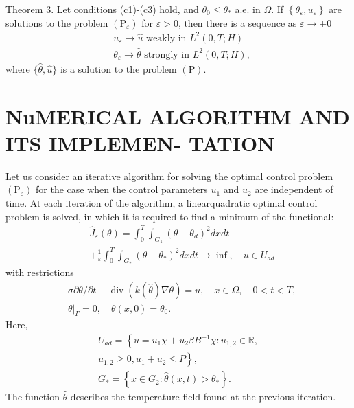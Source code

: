 \documentclass[10pt]{article}
\begin{document}
Theorem 3. Let conditions (c1)-(c3) hold, and $\theta_{0} \leq \theta_{*}$ a.e. in $\Omega$. If $\left\{\theta_{\varepsilon}, u_{\varepsilon}\right\}$ are solutions to the problem $\left(\mathrm{P}_{\varepsilon}\right)$ for $\varepsilon>0$, then there is a sequence as $\varepsilon \rightarrow+0$
$$
\begin{aligned}
&u_{\varepsilon} \rightarrow \widehat{u} \text { weakly in } L^{2}(0, T ; H) \\
&\theta_{\varepsilon} \rightarrow \widehat{\theta} \text { strongly in } L^{2}(0, T ; H),
\end{aligned}
$$
where $\{\widehat{\theta}, \widehat{u}\}$ is a solution to the problem $(\mathrm{P})$.

\section{NuMERICAL ALGORITHM AND ITS IMPLEMEN- TATION}
Let us consider an iterative algorithm for solving the optimal control problem $\left(\mathrm{P}_{\varepsilon}\right)$ for the case when the control parameters $u_{1}$ and $u_{2}$ are independent of time. At each iteration of the algorithm, a linearquadratic optimal control problem is solved, in which it is required to find a minimum of the functional:
$$
\begin{aligned}
&\widehat{J}_{\varepsilon}(\theta)=\int_{0}^{T} \int_{G_{1}}\left(\theta-\theta_{d}\right)^{2} d x d t \\
&+\frac{1}{\varepsilon} \int_{0}^{T} \int_{G_{*}}\left(\theta-\theta_{*}\right)^{2} d x d t \rightarrow \inf , \quad u \in U_{a d}
\end{aligned}
$$
with restrictions
$$
\begin{aligned}
&\sigma \partial \theta / \partial t-\operatorname{div}(k(\widehat{\theta}) \nabla \theta)=u, \quad x \in \Omega, \quad 0<t<T, \\
&\left.\theta\right|_{\Gamma}=0, \quad \theta(x, 0)=\theta_{0} .
\end{aligned}
$$
Here,
$$
\begin{gathered}
U_{a d}=\left\{u=u_{1} \chi+u_{2} \beta B^{-1} \chi: u_{1,2} \in \mathbb{R},\right. \\
\left.u_{1,2} \geq 0, u_{1}+u_{2} \leq P\right\}, \\
G_{*}=\left\{x \in G_{2}: \hat{\theta}(x, t)>\theta_{*}\right\} .
\end{gathered}
$$
The function $\widehat{\theta}$ describes the temperature field found at the previous iteration.
\end{document}
